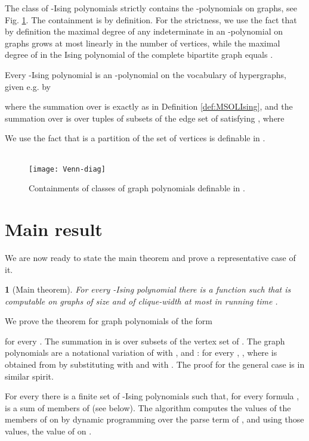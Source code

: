 \documentclass{llncs}
\newtheorem{thm}{\protect\theoremname}
\providecommand{\theoremname}{Theorem}
\begin{document}
The class of -Ising polynomials strictly contains the -polynomials on graphs, see Fig. \ref{fig}. The containment is by definition. 
For the strictness, we use the fact that by definition the maximal degree of any indeterminate in an -polynomial on graphs grows at most linearly in the number of vertices, while 
the maximal degree of  in the Ising polynomial 
of the complete bipartite graph  equals .

Every -Ising polynomial  is an -polynomial on the
vocabulary of hypergraphs, given e.g. by 

where the summation over  is exactly as in Definition \ref{def:MSOLIsing},
and the summation over  is over tuples 
of subsets of the edge set of  satisfying ,
where 

We use the fact that  is a partition of the set of vertices is definable in .  

\begin{figure}
  \caption{\label{fig} Containments of classes of graph polynomials definable in . }
  \ \\
  \centering
    \texttt{[image: Venn-diag]}
\end{figure}



\section{Main result}

We are now ready to state the main theorem and prove a representative
case of it. 
\begin{thm}
[Main theorem]\label{th:main} For every -Ising polynomial
 there is a function  such that 
is computable on graphs  of size  and of clique-width at most
 in running time . 
\end{thm}


We prove
the theorem for graph polynomials of the form 

 for every . The summation in 
is over subsets  of the vertex set of . The graph polynomials
 are a notational variation of  with ,  and : 
for every , ,
where  is obtained from  by substituting 
with  and  with . The proof for the general case is 
in similar spirit. 

For every  there is a finite set  of -Ising polynomials
 such that, for every formula ,
 is a sum of members of  (see below).  
The algorithm computes the values of the members of  on  
by dynamic programming over the parse term of , and using those values, the value of  on .   
\end{document}
